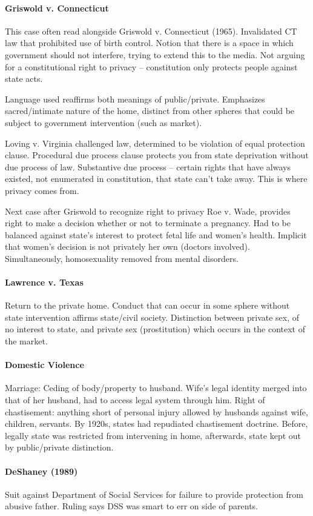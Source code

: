 \paragraph{Griswold v. Connecticut} This case often read alongside Griswold v. Connecticut (1965). Invalidated CT law that prohibited use of birth control. Notion that there is a space in which government should not interfere, trying to extend this to the media. Not arguing for a constitutional right to privacy -- constitution only protects people against state acts.

Language used reaffirms both meanings of public/private. Emphasizes sacred/intimate nature of the home, distinct from other spheres that could be subject to government intervention (such as market).

Loving v. Virginia challenged law, determined to be violation of equal protection clause. Procedural due process clause protects you from state deprivation without due process of law. Substantive due process -- certain rights that have always existed, not enumerated in constitution, that state can't take away. This is where privacy comes from.

Next case after Griswold to recognize right to privacy Roe v. Wade, provides right to make a decision whether or not to terminate a pregnancy. Had to be balanced against state's interest to protect fetal life and women's health. Implicit that women's decision is not privately her own (doctors involved). Simultaneously, homosexuality removed from mental disorders.

\paragraph{Lawrence v. Texas} Return to the private home. Conduct that can occur in some sphere without state intervention affirms state/civil society. Distinction between private sex, of no interest to state, and private sex (prostitution) which occurs in the context of the market.

\paragraph{Domestic Violence} Marriage: Ceding of body/property to husband. Wife's legal identity merged into that of her husband, had to access legal system through him. Right of chastisement: anything short of personal injury allowed by husbands against wife, children, servants. By 1920s, states had repudiated chastisement doctrine. Before, legally state was restricted from intervening in home, afterwards, state kept out by public/private distinction.

\paragraph{DeShaney (1989)} Suit against Department of Social Services for failure to provide protection from abusive father. Ruling says DSS was smart to err on side of parents.

